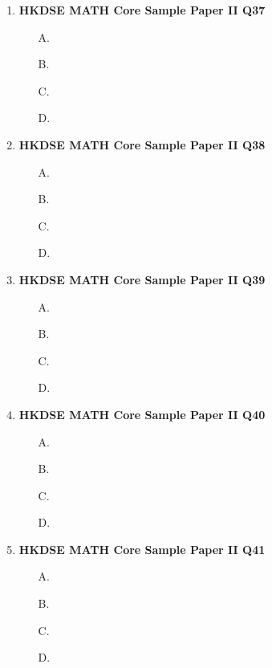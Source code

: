 \documentclass[12pt]{article}
\begin{document}
\begin{enumerate}
	\begin{enumerate}
		\item[A.]
		\item[B.]
		\item[C.]
		\item[D.]
	\end{enumerate}
	\item \textbf{HKDSE MATH Core Sample Paper II Q37}\\
	\begin{enumerate}
		\item[A.]
		\item[B.]
		\item[C.]
		\item[D.]
	\end{enumerate}
	\item \textbf{HKDSE MATH Core Sample Paper II Q38}\\
	\begin{enumerate}
		\item[A.]
		\item[B.]
		\item[C.]
		\item[D.]
	\end{enumerate}
	\item \textbf{HKDSE MATH Core Sample Paper II Q39}\\
	\begin{enumerate}
		\item[A.]
		\item[B.]
		\item[C.]
		\item[D.]
	\end{enumerate}
	\item \textbf{HKDSE MATH Core Sample Paper II Q40}\\
	\begin{enumerate}
		\item[A.]
		\item[B.]
		\item[C.]
		\item[D.]
	\end{enumerate}
	\item \textbf{HKDSE MATH Core Sample Paper II Q41}\\
	\begin{enumerate}
		\item[A.]
		\item[B.]
		\item[C.]
		\item[D.]
	\end{enumerate}

\end{enumerate}
\end{document}
